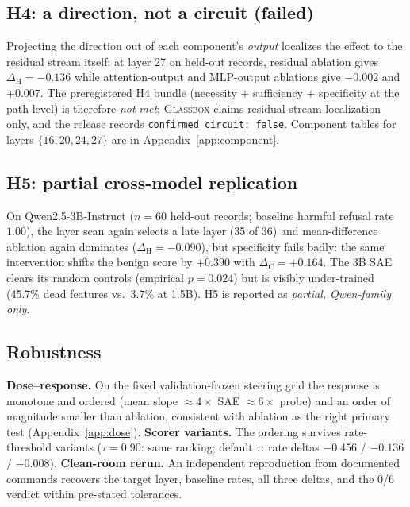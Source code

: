 \documentclass[11pt]{article}
\newcommand{\dH}{\ensuremath{\Delta_{\mathrm{H}}}}
\newcommand{\dC}{\ensuremath{\Delta_{\mathrm{C}}}}
\newcommand{\glassbox}{\textsc{Glassbox}}
\begin{document}
\subsection{H4: a direction, not a circuit (failed)}
\label{sec:h4}

Projecting the direction out of each component's \emph{output} localizes the
effect to the residual stream itself: at layer 27 on held-out records,
residual ablation gives $\dH=-0.136$ while attention-output and MLP-output
ablations give $-0.002$ and $+0.007$.  The preregistered H4 bundle (necessity
$+$ sufficiency $+$ specificity at the path level) is therefore \emph{not
met}; \glassbox{} claims residual-stream localization only, and the release
records \texttt{confirmed\_circuit: false}.  Component tables for layers
$\{16,20,24,27\}$ are in Appendix~\ref{app:component}.

\subsection{H5: partial cross-model replication}
\label{sec:h5}

On Qwen2.5-3B-Instruct ($n=60$ held-out records; baseline harmful refusal rate
$1.00$), the layer scan again selects a late layer (35 of 36) and
mean-difference ablation again dominates ($\dH=-0.090$), but specificity fails
badly: the same intervention shifts the benign score by $+0.390$ with
$\dC=+0.164$.  The 3B SAE clears its random controls (empirical $p=0.024$)
but is visibly under-trained (45.7\% dead features vs.\ 3.7\% at 1.5B).  H5 is
reported as \emph{partial, Qwen-family only}.

\subsection{Robustness}
\label{sec:robustness}

\textbf{Dose--response.}  On the fixed validation-frozen steering grid the
response is monotone and ordered (mean slope $\approx4\times$ SAE
$\approx6\times$ probe) and an order of magnitude smaller than ablation,
consistent with ablation as the right primary test
(Appendix~\ref{app:dose}).
\textbf{Scorer variants.}  The ordering survives rate-threshold variants
($\tau=0.90$: same ranking; default $\tau$: rate deltas $-0.456$ / $-0.136$ /
$-0.008$).
\textbf{Clean-room rerun.}  An independent reproduction from documented
commands recovers the target layer, baseline rates, all three deltas, and the
0/6 verdict within pre-stated tolerances.
\end{document}
